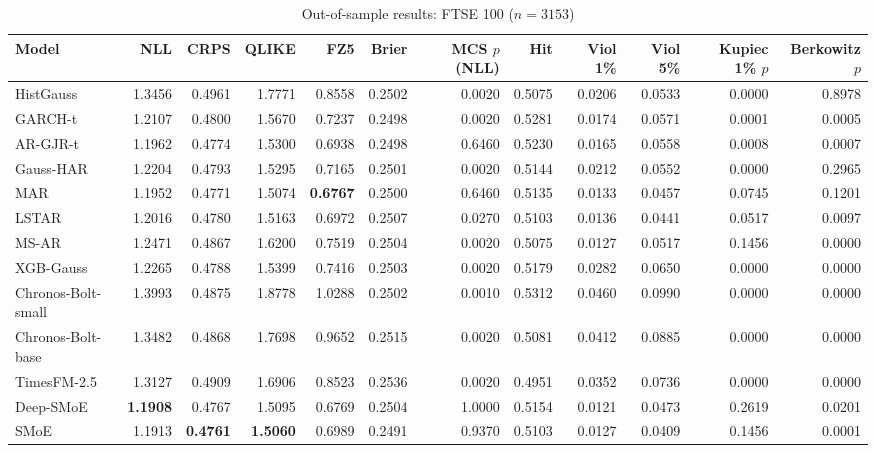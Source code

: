 \begin{table}[!htbp]\centering\scriptsize
\caption{Out-of-sample results: FTSE 100 ($n=3153$)}\label{tab:asset_ftse}
\begin{adjustbox}{max width=\textwidth}
\begin{tabular}{lrrrrrrrrrrr}
\toprule
Model & NLL & CRPS & QLIKE & FZ5 & Brier & MCS $p$ (NLL) & Hit & Viol 1\% & Viol 5\% & Kupiec 1\% $p$ & Berkowitz $p$\\
\midrule
HistGauss & 1.3456 & 0.4961 & 1.7771 & 0.8558 & 0.2502 & 0.0020 & 0.5075 & 0.0206 & 0.0533 & 0.0000 & 0.8978\\
GARCH-t & 1.2107 & 0.4800 & 1.5670 & 0.7237 & 0.2498 & 0.0020 & 0.5281 & 0.0174 & 0.0571 & 0.0001 & 0.0005\\
AR-GJR-t & 1.1962 & 0.4774 & 1.5300 & 0.6938 & 0.2498 & 0.6460 & 0.5230 & 0.0165 & 0.0558 & 0.0008 & 0.0007\\
Gauss-HAR & 1.2204 & 0.4793 & 1.5295 & 0.7165 & 0.2501 & 0.0020 & 0.5144 & 0.0212 & 0.0552 & 0.0000 & 0.2965\\
MAR & 1.1952 & 0.4771 & 1.5074 & \textbf{0.6767} & 0.2500 & 0.6460 & 0.5135 & 0.0133 & 0.0457 & 0.0745 & 0.1201\\
LSTAR & 1.2016 & 0.4780 & 1.5163 & 0.6972 & 0.2507 & 0.0270 & 0.5103 & 0.0136 & 0.0441 & 0.0517 & 0.0097\\
MS-AR & 1.2471 & 0.4867 & 1.6200 & 0.7519 & 0.2504 & 0.0020 & 0.5075 & 0.0127 & 0.0517 & 0.1456 & 0.0000\\
XGB-Gauss & 1.2265 & 0.4788 & 1.5399 & 0.7416 & 0.2503 & 0.0020 & 0.5179 & 0.0282 & 0.0650 & 0.0000 & 0.0000\\
Chronos-Bolt-small & 1.3993 & 0.4875 & 1.8778 & 1.0288 & 0.2502 & 0.0010 & 0.5312 & 0.0460 & 0.0990 & 0.0000 & 0.0000\\
Chronos-Bolt-base & 1.3482 & 0.4868 & 1.7698 & 0.9652 & 0.2515 & 0.0020 & 0.5081 & 0.0412 & 0.0885 & 0.0000 & 0.0000\\
TimesFM-2.5 & 1.3127 & 0.4909 & 1.6906 & 0.8523 & 0.2536 & 0.0020 & 0.4951 & 0.0352 & 0.0736 & 0.0000 & 0.0000\\
Deep-SMoE & \textbf{1.1908} & 0.4767 & 1.5095 & 0.6769 & 0.2504 & 1.0000 & 0.5154 & 0.0121 & 0.0473 & 0.2619 & 0.0201\\
SMoE & 1.1913 & \textbf{0.4761} & \textbf{1.5060} & 0.6989 & 0.2491 & 0.9370 & 0.5103 & 0.0127 & 0.0409 & 0.1456 & 0.0001\\
\bottomrule
\end{tabular}
\end{adjustbox}
\end{table}